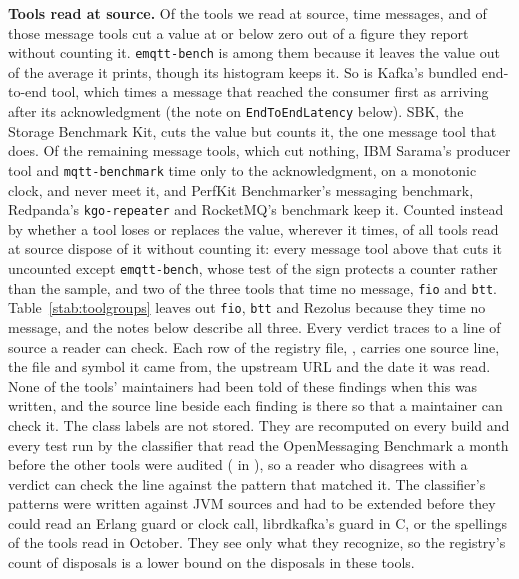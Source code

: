 \documentclass[10pt,journal,onecolumn]{IEEEtran}
\newcommand{\kafka}{Kafka}
\begin{document}
\textbf{Tools read at source.} Of the \harnessAuditedWord{} tools we read at source,
\harnessMessageWord{} time messages, and \harnessMessageCutWord{} of those message tools cut a value
at or below zero out of a figure they report without counting it. \texttt{emqtt-bench} is among
them because it leaves the value out of the average it prints, though its histogram keeps it. So
is \kafka{}'s bundled end-to-end tool, which times a message that reached the consumer first as
arriving after its acknowledgment (the note on \texttt{EndToEndLatency} below). SBK, the Storage
Benchmark Kit, cuts the value but counts it, the one message tool that does. Of the remaining
\harnessMessageUncutWord{} message tools, which cut nothing, IBM Sarama's producer tool and
\texttt{mqtt-benchmark} time only to the acknowledgment, on a monotonic clock, and never meet it,
and PerfKit Benchmarker's messaging benchmark, Redpanda's \texttt{kgo-repeater} and RocketMQ's
benchmark keep it. Counted instead by whether a tool loses or replaces the value, wherever it
times, \harnessSilentWord{} of all \harnessAuditedWord{} tools read at source dispose of it without
counting it: every message tool above that cuts it uncounted except \texttt{emqtt-bench}, whose
test of the sign protects a counter rather than the sample, and two of the three tools that time no message,
\texttt{fio} and \texttt{btt}. Table~\ref{stab:toolgroups} leaves out \texttt{fio},
\texttt{btt} and Rezolus because they time no message, and the notes below describe all three.
Every verdict traces to a line of source a reader can check. Each row of the registry file,
, carries one source line, the file and symbol it
came from, the upstream URL and the date it was read. None of the tools' maintainers had been told
of these findings when this was written, and the source line beside each finding is there so that
a maintainer can check it. The class labels are not stored. They are
recomputed on every build and every test run by the classifier that read the OpenMessaging
Benchmark a month before the other tools were audited ( in
), so a reader who disagrees with a verdict can check the
line against the pattern that matched it. The classifier's patterns were written against JVM
sources and had to be extended before they could read an Erlang guard or clock call, librdkafka's
guard in C, or the spellings of the tools read in October. They see only what they recognize, so
the registry's count of disposals is a lower bound on the disposals in these tools.
\end{document}

